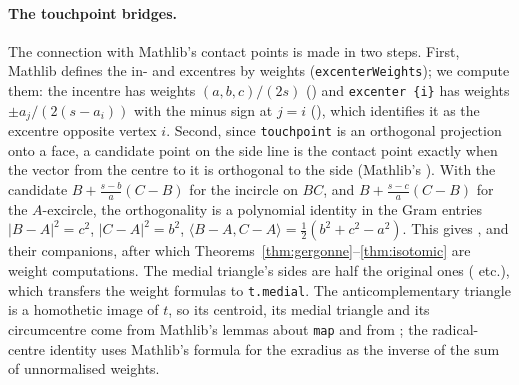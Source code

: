\documentclass[11pt]{article}
\theoremstyle{definition}
\theoremstyle{remark}
\newcommand{\lean}[1]{\texttt{#1}}
\begin{document}
\paragraph{The touchpoint bridges.} The connection with Mathlib's contact points is made in two steps.
First, Mathlib defines the in- and excentres by weights (\lean{excenterWeights}); we compute them:
the incentre has weights $(a,b,c)/(2s)$ () and
\lean{excenter \{i\}} has weights $\pm a_j/(2(s-a_i))$ with the minus sign at $j=i$
(), which identifies it as the excentre opposite vertex $i$. Second,
since \lean{touchpoint} is an orthogonal projection onto a face, a candidate point on the side line is
the contact point exactly when the vector from the centre to it is orthogonal to the side (Mathlib's
). With the candidate
$B+\frac{s-b}{a}(C-B)$ for the incircle on $BC$, and $B+\frac{s-c}{a}(C-B)$ for the $A$-excircle,
the orthogonality is a polynomial identity in the Gram entries
$|B-A|^2=c^2$, $|C-A|^2=b^2$, $\langle B-A,C-A\rangle=\tfrac12(b^2+c^2-a^2)$. This gives
,  and their
companions, after which Theorems~\ref{thm:gergonne}--\ref{thm:isotomic} are weight computations.
The medial triangle's sides are half the original ones ( etc.), which
transfers the weight formulas to \lean{t.medial}. The anticomplementary triangle is a homothetic image
of $t$, so its centroid, its medial triangle and its circumcentre come from Mathlib's lemmas about
\lean{map} and from ; the radical-centre identity
uses Mathlib's formula for the exradius as the inverse of the sum of unnormalised weights.
\end{document}
